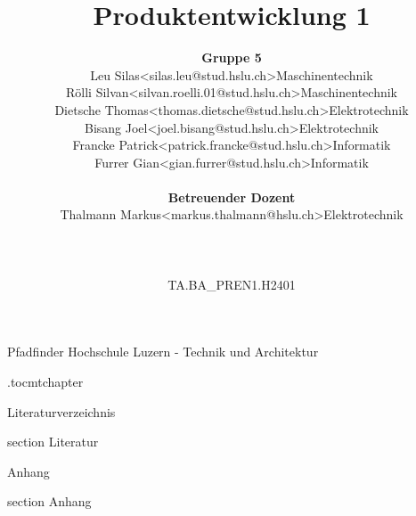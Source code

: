 \documentclass[oneside]{modern}
\title{Produktentwicklung 1}
\author{
\begin{tabular}{ l l l}
  \textbf{Gruppe 5} && \\
  Leu Silas & <silas.leu@stud.hslu.ch> & Maschinentechnik \\
  Rölli Silvan & <silvan.roelli.01@stud.hslu.ch> & Maschinentechnik \\
  Dietsche Thomas & <thomas.dietsche@stud.hslu.ch> & Elektrotechnik \\
  Bisang Joel & <joel.bisang@stud.hslu.ch> & Elektrotechnik \\
  Francke Patrick & <patrick.francke@stud.hslu.ch> & Informatik \\
  Furrer Gian & <gian.furrer@stud.hslu.ch> & Informatik \\
  \\
  \textbf{Betreuender Dozent} && \\
  Thalmann Markus & <markus.thalmann@hslu.ch> & Elektrotechnik \\
  \\
  \\
  \\
  TA.BA\_PREN1.H2401 &&\\
\end{tabular}
}
\begin{document}
   \renewcommand{\thesection}{\arabic{section}}
   \makeatletter
   \g@addto@macro{\UrlBreaks}{\UrlOrds}
   \makeatother
   


  \nocite{*}

  \firstpage
    {Pfadfinder}
    {Hochschule Luzern - Technik und Architektur}
    {\theauthor}

  
  \newpage
  \etocdepthtag.toc{mtchapter}
  \addtableofcontents
  


  \newpage
  
  

  
  
  
  
  
  
  
  
  

  \newpage
  \listoffigures
  
  \newpage
  \listoftables
  
  \newpage
  \addglossary

  Literaturverzeichnis
  \newpage
    {section}
    {Literatur}

  \printbibliography[
    heading=subbibliography
  ]

  Anhang
    {section}
    {Anhang}
    
  
\end{document}

